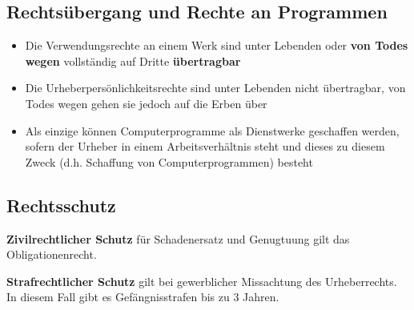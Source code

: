 \hypertarget{rechtsuxfcbergang-und-rechte-an-programmen}{%
\subsection{Rechtsübergang und Rechte an
Programmen}\label{rechtsuxfcbergang-und-rechte-an-programmen}}

\begin{itemize}
\tightlist
\item
  Die Verwendungsrechte an einem Werk sind unter Lebenden oder
  \textbf{von Todes wegen} vollständig auf Dritte \textbf{übertragbar}
\item
  Die Urheberpersönlichkeitsrechte sind unter Lebenden nicht
  übertragbar, von Todes wegen gehen sie jedoch auf die Erben über
\item
  Als einzige können Computerprogramme als Dienstwerke geschaffen
  werden, sofern der Urheber in einem Arbeitsverhältnis steht und dieses
  zu diesem Zweck (d.h. Schaffung von Computerprogrammen) besteht
\end{itemize}

\hypertarget{rechtsschutz}{%
\subsection{Rechtsschutz}\label{rechtsschutz}}

\textbf{Zivilrechtlicher Schutz} für Schadenersatz und Genugtuung gilt
das Obligationenrecht.

\textbf{Strafrechtlicher Schutz} gilt bei gewerblicher Missachtung des
Urheberrechts. In diesem Fall gibt es Gefängnisstrafen bis zu 3 Jahren.
